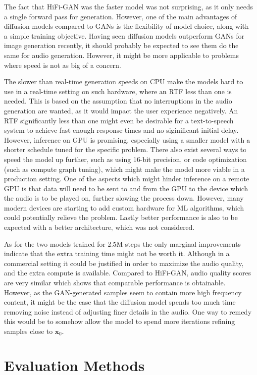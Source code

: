 \documentclass{report}
\begin{document}
The fact that HiFi-GAN was the faster model was not surprising, as it only needs a single forward pass for generation. However, one of the main advantages of diffusion models compared to GANs is the flexibility of model choice, along with a simple training objective. Having seen diffusion models outperform GANs for image generation recently, it should probably be expected to see them do the same for audio generation. However, it might be more applicable to problems where speed is not as big of a concern.

The slower than real-time generation speeds on CPU make the models hard to use in a real-time setting on such hardware, where an RTF less than one is needed. This is based on the assumption that no interruptions in the audio generation are wanted, as it would impact the user experience negatively. An RTF significantly less than one might even be desirable for a text-to-speech system to achieve fast enough response times and no siginificant initial delay. However, inference on GPU is promising, especially using a smaller model with a shorter schedule tuned for the specific problem. There also exist several ways to speed the model up further, such as using 16-bit precision, or code optimization (such as compute graph tuning), which might make the model more viable in a production setting. One of the aspects which might hinder inference on a remote GPU is that data will need to be sent to and from the GPU to the device which the audio is to be played on, further slowing the process down. However, many modern devices are starting to add custom hardware for ML algorithms, which could potentially relieve the problem. Lastly better performance is also to be expected with a better architecture, which was not considered.

As for the two models trained for 2.5M steps the only marginal improvements indicate that the extra training time might not be worth it. Although in a commercial setting it could be justified in order to maximize the audio quality, and the extra compute is available. Compared to HiFi-GAN, audio quality scores are very similar which shows that comparable performance is obtainable. However, as the GAN-generated samples seem to contain more high frequency content, it might be the case that the diffusion model spends too much time removing noise instead of adjusting finer details in the audio. One way to remedy this would be to somehow allow the model to spend more iterations refining samples close to $\bm{x}_0$.

\section{Evaluation Methods}
\end{document}
